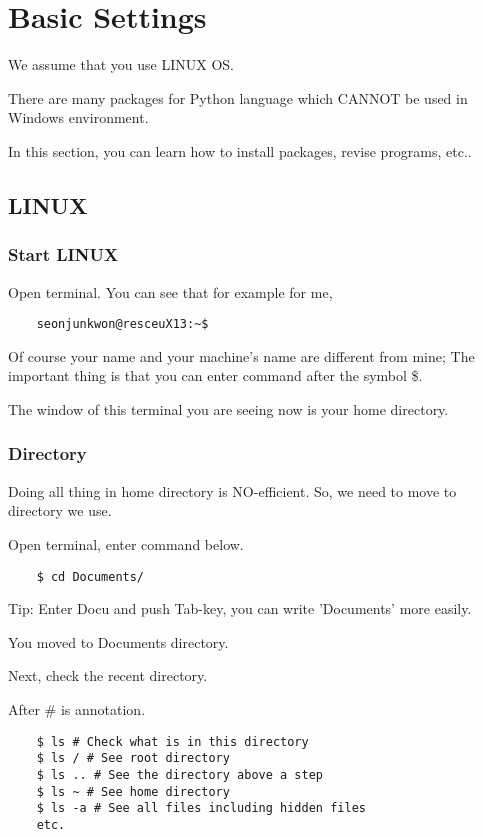 \newpage
\section{Basic Settings}

We assume that you use LINUX OS.

There are many packages for Python language which CANNOT be used in Windows environment.

In this section, you can learn how to install packages, revise programs, etc..

\subsection{LINUX}

\subsubsection{Start LINUX}

Open terminal. You can see that for example for me,

\begin{verbatim}
    seonjunkwon@resceuX13:~$
\end{verbatim}

Of course your name and your machine's name are different from mine; The important thing is that you can enter command after the symbol \$.

The window of this terminal you are seeing now is your home directory.

\subsubsection{Directory}

Doing all thing in home directory is NO-efficient. So, we need to move to directory we use.

Open terminal, enter command below.

\begin{verbatim}
    $ cd Documents/
\end{verbatim}

Tip: Enter Docu and push Tab-key, you can write 'Documents' more easily.

You moved to Documents directory.

Next, check the recent directory.

After \# is annotation.

\begin{verbatim}
    $ ls # Check what is in this directory
    $ ls / # See root directory
    $ ls .. # See the directory above a step
    $ ls ~ # See home directory
    $ ls -a # See all files including hidden files
    etc.
\end{verbatim}

